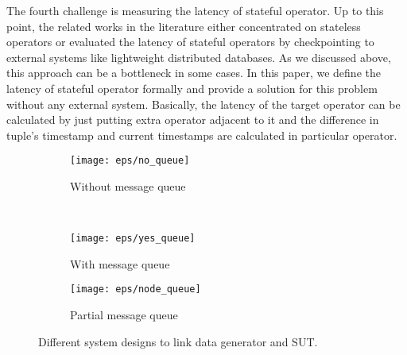  The fourth challenge is measuring the latency of stateful operator. Up to this point, the related works in the literature either concentrated on stateless operators or evaluated the latency of stateful operators by checkpointing to external systems like lightweight distributed databases. As we discussed above, this approach can be a bottleneck in some cases. In this paper, we  define the latency of stateful operator formally and  provide a solution for this problem without any external system. Basically, the latency of the target operator can be calculated by just putting extra operator adjacent to it and the difference in tuple's timestamp and current timestamps are calculated in particular operator.

\begin{figure*}
    \centering
    \begin{subfigure}[b]{0.32\textwidth}
        \texttt{[image: eps/no\_queue]}
        \caption{Without message queue}
        \label{fig_no_queue}
    \end{subfigure}
    ~ %
    \begin{subfigure}[b]{0.32\textwidth}
        \texttt{[image: eps/yes\_queue]}
        \caption{With message queue}
        \label{fig_yes_queue}
    \end{subfigure}
    \begin{subfigure}[b]{0.32\textwidth}
        \texttt{[image: eps/node\_queue]}
        \caption{Partial message queue}
        \label{fig_partial_queue}
    \end{subfigure}
        \caption{Different system designs to link data generator and SUT.}
            \label{fig_queue_link}
\end{figure*}
